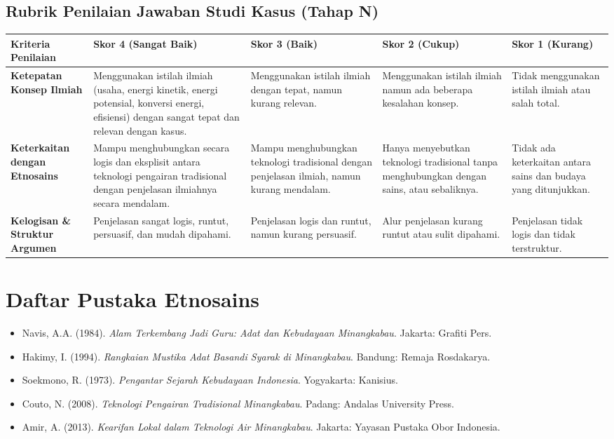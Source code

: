 \documentclass[12pt,a4paper]{article}
\begin{document}
\subsection{Rubrik Penilaian Jawaban Studi Kasus (Tahap N)}

\begin{center}
\begin{tabular}{|p{3cm}|p{3cm}|p{3cm}|p{3cm}|p{3cm}|}
\hline
\textbf{Kriteria Penilaian} & \textbf{Skor 4 (Sangat Baik)} & \textbf{Skor 3 (Baik)} & \textbf{Skor 2 (Cukup)} & \textbf{Skor 1 (Kurang)} \\
\hline
\textbf{Ketepatan Konsep Ilmiah} & Menggunakan istilah ilmiah (usaha, energi kinetik, energi potensial, konversi energi, efisiensi) dengan sangat tepat dan relevan dengan kasus. & Menggunakan istilah ilmiah dengan tepat, namun kurang relevan. & Menggunakan istilah ilmiah namun ada beberapa kesalahan konsep. & Tidak menggunakan istilah ilmiah atau salah total. \\
\hline
\textbf{Keterkaitan dengan Etnosains} & Mampu menghubungkan secara logis dan eksplisit antara teknologi pengairan tradisional dengan penjelasan ilmiahnya secara mendalam. & Mampu menghubungkan teknologi tradisional dengan penjelasan ilmiah, namun kurang mendalam. & Hanya menyebutkan teknologi tradisional tanpa menghubungkan dengan sains, atau sebaliknya. & Tidak ada keterkaitan antara sains dan budaya yang ditunjukkan. \\
\hline
\textbf{Kelogisan \& Struktur Argumen} & Penjelasan sangat logis, runtut, persuasif, dan mudah dipahami. & Penjelasan logis dan runtut, namun kurang persuasif. & Alur penjelasan kurang runtut atau sulit dipahami. & Penjelasan tidak logis dan tidak terstruktur. \\
\hline
\end{tabular}
\end{center}

\vspace{1cm}

\section{Daftar Pustaka Etnosains}
\begin{itemize}
\item Navis, A.A. (1984). \textit{Alam Terkembang Jadi Guru: Adat dan Kebudayaan Minangkabau}. Jakarta: Grafiti Pers.
\item Hakimy, I. (1994). \textit{Rangkaian Mustika Adat Basandi Syarak di Minangkabau}. Bandung: Remaja Rosdakarya.
\item Soekmono, R. (1973). \textit{Pengantar Sejarah Kebudayaan Indonesia}. Yogyakarta: Kanisius.
\item Couto, N. (2008). \textit{Teknologi Pengairan Tradisional Minangkabau}. Padang: Andalas University Press.
\item Amir, A. (2013). \textit{Kearifan Lokal dalam Teknologi Air Minangkabau}. Jakarta: Yayasan Pustaka Obor Indonesia.
\end{itemize}
\end{document}
